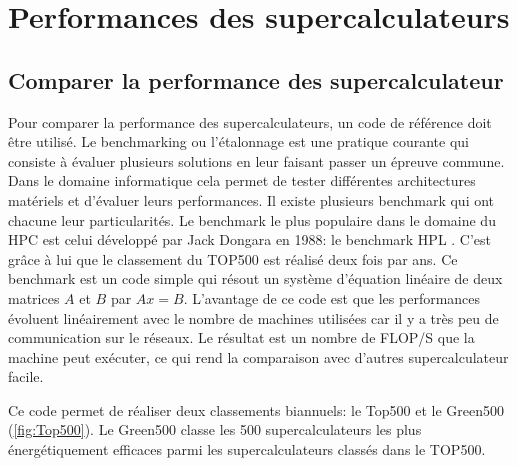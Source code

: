 \section{Performances des supercalculateurs}\label{sec:edl_evolution}





\subsection{Comparer la performance des supercalculateur}
        
        Pour comparer la performance des supercalculateurs, un code de référence doit être utilisé. Le benchmarking ou l'étalonnage est une pratique courante qui consiste à évaluer plusieurs solutions en leur faisant passer un épreuve commune. Dans le domaine informatique cela permet de tester différentes architectures matériels et d'évaluer leurs performances. Il existe plusieurs benchmark qui ont chacune leur particularités. Le benchmark le plus populaire dans le domaine du HPC est celui développé par Jack Dongara en 1988: le benchmark HPL \cite{Dongarra}. C'est grâce à lui que le classement du TOP500 est réalisé deux fois par ans. Ce benchmark est un code simple qui résout un système d'équation linéaire de deux matrices $A$ et $B$ par $Ax = B$. L'avantage de ce code est que les performances évoluent linéairement avec le nombre de machines utilisées car il y a très peu de communication sur le réseaux. Le résultat est un nombre de FLOP/S que la machine peut exécuter, ce qui rend la comparaison avec d'autres supercalculateur facile. 
    
    
        Ce code permet de réaliser deux classements biannuels: le Top500 et le Green500 (\autoref{fig:Top500}). Le Green500 classe les 500 supercalculateurs les plus énergétiquement efficaces parmi les supercalculateurs classés dans le TOP500.
        
